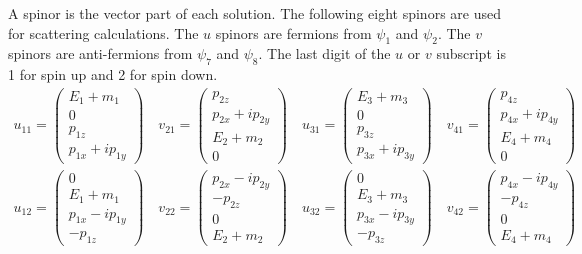 \documentclass[12pt]{article}
\begin{document}
\noindent
A spinor is the vector part of each solution.
The following eight spinors are used for scattering calculations.
The $u$ spinors are fermions from $\psi_1$ and $\psi_2$.
The $v$ spinors are anti-fermions from $\psi_7$ and $\psi_8$.
The last digit of the $u$ or $v$ subscript is 1 for spin up and 2 for spin down.
\begin{gather*}
u_{11}=\begin{pmatrix}E_1+m_1\\0\\p_{1z}\\p_{1x}+ip_{1y}\end{pmatrix}\quad
v_{21}=\begin{pmatrix}p_{2z}\\p_{2x}+ip_{2y}\\E_2+m_2\\0\end{pmatrix}\quad
u_{31}=\begin{pmatrix}E_3+m_3\\0\\p_{3z}\\p_{3x}+ip_{3y}\end{pmatrix}\quad
v_{41}=\begin{pmatrix}p_{4z}\\p_{4x}+ip_{4y}\\E_4+m_4\\0\end{pmatrix}\\
u_{12}=\begin{pmatrix}0\\E_1+m_1\\p_{1x}-ip_{1y}\\-p_{1z}\end{pmatrix}\quad
v_{22}=\begin{pmatrix}p_{2x}-ip_{2y}\\-p_{2z}\\0\\E_2+m_2\end{pmatrix}\quad
u_{32}=\begin{pmatrix}0\\E_3+m_3\\p_{3x}-ip_{3y}\\-p_{3z}\end{pmatrix}\quad
v_{42}=\begin{pmatrix}p_{4x}-ip_{4y}\\-p_{4z}\\0\\E_4+m_4\end{pmatrix}
\end{gather*}
\end{document}
